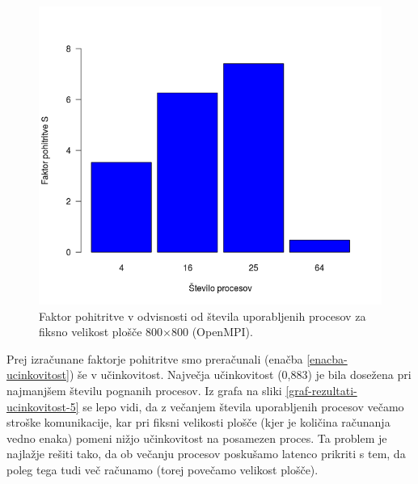 \documentclass[a4paper,titlepage,11pt]{article}
\begin{document}
\begin{figure}[H]
\begin{center}
\includegraphics[scale=0.5]{graf-rezultati-5_2.png}
\caption{Faktor pohitritve v odvisnosti od števila uporabljenih procesov za fiksno velikost plošče 800$\times$800 (OpenMPI).}
\label{graf-rezultati-pohitritev-5}
\end{center}
\vspace{-25pt}
\end{figure}

Prej izračunane faktorje pohitritve smo preračunali (enačba \ref{enacba-ucinkovitost}) še v učinkovitost. Največja učinkovitost (0,883) je bila dosežena pri najmanjšem številu pognanih procesov. Iz grafa na sliki \ref{graf-rezultati-ucinkovitost-5} se lepo vidi, da z večanjem števila uporabljenih procesov večamo stroške komunikacije, kar pri fiksni velikosti plošče (kjer je količina računanja vedno enaka) pomeni nižjo učinkovitost na posamezen proces. Ta problem je najlažje rešiti tako, da ob večanju procesov poskušamo latenco prikriti s tem, da poleg tega tudi več računamo (torej povečamo velikost plošče).
\end{document}
